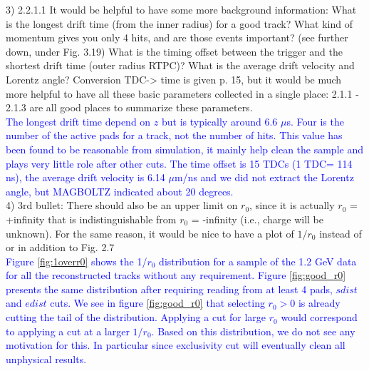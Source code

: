 3) 2.2.1.1 It would be helpful to have some more background information: What 
is the longest drift time (from the inner radius) for a good track? What kind 
of momentum gives you only 4 hits, and are those events important? (see further 
down, under Fig. 3.19) What is the timing offset between the trigger and the 
shortest drift time (outer radius RTPC)? What is the average drift velocity and 
Lorentz angle? Conversion TDC-> time is given p. 15, but it would be much more 
helpful to have all these basic parameters collected in a single place: 2.1.1 - 
2.1.3 are all good places to summarize these parameters.\\
\textcolor{blue}{
  The longest drift time depend on $z$ but is typically around 6.6 $\mu$s. 
  Four is the number of the active pads for a track, not the number of hits.  
  This value has been found to be reasonable from simulation, it mainly help 
  clean the sample and plays very little role after other cuts. The time offset 
  is 15 TDCs (1 TDC= 114 ns), the average drift velocity is 6.14 $\mu$m/ns and 
  we did not extract the Lorentz angle, but MAGBOLTZ indicated about 20 
  degrees.}\\

4) 3rd bullet: There should also be an upper limit on $r_0$, since it is 
actually $r_0$ = +infinity that is indistinguishable from $r_0$ = -infinity 
(i.e., charge will be unknown). For the same reason, it would be nice to have a 
plot of $1/r_0$ instead of or in addition to Fig. 2.7 \\
\textcolor{blue}{Figure \ref{fig:1overr0} shows the 1/$r_0$
   distribution for a sample of the 1.2 GeV data for all the reconstructed 
   tracks without any requirement. Figure \ref{fig:good_r0} presents the same 
   distribution after requiring reading from at least 4 pads, $sdist$ and 
   $edist$ cuts. We see in figure \ref{fig:good_r0} that selecting 
   $r_0>0$ is already cutting the tail of the distribution. Applying a cut for 
   large $r_0$ would correspond to applying a cut at a larger $1/r_0$. Based on this
   distribution, we do not see any motivation for this. In particular since exclusivity
   cut will eventually clean all unphysical results.}\\

